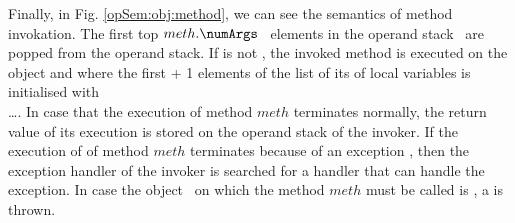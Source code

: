        Finally, in Fig. \ref{opSem:obj:method}, we can see the semantics of method invokation. 
	 The first top $meth.\numArgs$ \ elements in the operand stack \stackOnly \ are popped from the operand stack. If 
          is not \Mynull, the invoked method is executed on the object    
	 and where the first \numArgs + 1 elements of the list of its of local variables is initialised with \\
          \ldots \stackOnlyParam{\counterOnly}. In case that the execution of method $meth$
	 terminates normally, the return value \Res{}  of its execution is stored on the operand stack of the invoker. 
	 If the execution of of method $meth$ terminates because of an exception \Exc, then the exception handler of the invoker is searched for
	 a handler that can handle the exception. In case the object   \  on which the  method $meth$ must be 
	 called is \Mynull, a \NullPointerExc{} is thrown.  			



